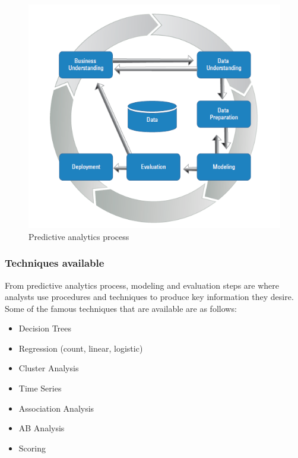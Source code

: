\documentclass[runningheads]{llncs}
\begin{document}
\begin{figure}[htbp]
	\centering
	
	\includegraphics[scale=0.7]{Figure1.png}
	\caption{Predictive analytics process}
	\label{fig:Figure1}
\end{figure}
\newline
\subsubsection{Techniques available}
From predictive analytics process, modeling and evaluation steps are where analysts use procedures and techniques to produce key information they desire. Some of the famous techniques \cite{6} that are available are as follows: \newline
\begin{itemize}
	\item Decision Trees
	\item Regression (count, linear, logistic)
	\item Cluster Analysis
	\item Time Series
	\item Association Analysis
	\item AB Analysis
	\item Scoring
\end{itemize} 
\end{document}
